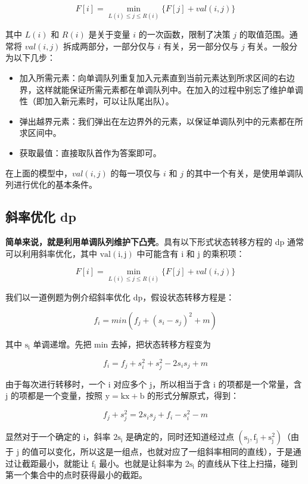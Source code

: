 \documentclass[UTF8]{article}
\begin{document}
$$
F[i] = \min\limits_{L(i) \le j \le R(i)} \{F[j] + val(i, j)\}
$$

其中 $L(i)$ 和 $R(i)$ 是关于变量 $i$ 的一次函数，限制了决策 $j$ 的取值范围。通常将 $val(i, j)$ 拆成两部分，一部分仅与 $i$ 有关，另一部分仅与 $j$ 有关。一般分为以下几步：

\begin{itemize}
	\item 加入所需元素：向单调队列重复加入元素直到当前元素达到所求区间的右边界，这样就能保证所需元素都在单调队列中。在加入的过程中别忘了维护单调性（即加入新元素时，可以让队尾出队）。
	\item 弹出越界元素：我们弹出在左边界外的元素，以保证单调队列中的元素都在所求区间中。
	\item 获取最值：直接取队首作为答案即可。
\end{itemize}

在上面的模型中，$val(i, j)$ 的每一项仅与 $i$ 和 $j$ 的其中一个有关，是使用单调队列进行优化的基本条件。


\subsection{斜率优化 dp}
\textbf{简单来说，就是利用单调队列维护下凸壳}。具有以下形式状态转移方程的 dp 通常可以利用斜率优化，其中 $\mathrm{val(i, j)}$ 中可能含有 $\mathrm{i}$ 和 $\mathrm{j}$ 的乘积项：

$$
F[i] = \min\limits_{L(i) \le j \le R(i)} \{F[j] + val(i, j)\}
$$

我们以一道例题为例介绍斜率优化 dp，假设状态转移方程是：

$$
f_i = min(f_j + (s_i - s_j)^2 +m)
$$

其中 $\mathrm{s_i}$ 单调递增。先把 min 去掉，把状态转移方程变为

$$
f_i = f_j + s_i^2 + s_j^2 - 2s_is_j + m
$$

由于每次进行转移时，一个 $\mathrm{i}$ 对应多个 $\mathrm{j}$，所以相当于含 $\mathrm{i}$ 的项都是一个常量，含 $\mathrm{j}$ 的项都是一个变量，按照 $\mathrm{y = kx + b}$ 的形式分解原式，得到：

$$
f_j + s_j^2 = 2s_is_j + f_i - s_i^2 - m
$$

显然对于一个确定的 $\mathrm{i}$，斜率 $\mathrm{2s_i}$ 是确定的，同时还知道经过点 $\mathrm{(s_j, f_j + s_j ^ 2)}$（由于 $\mathrm{j}$ 的值可以变化，所以这是一组点，也就对应了一组斜率相同的直线），于是通过让截距最小，就能让 $\mathrm{f_i}$ 最小。也就是让斜率为 $\mathrm{2s_i}$ 的直线从下往上扫描，碰到第一个集合中的点时获得最小的截距。
\end{document}
